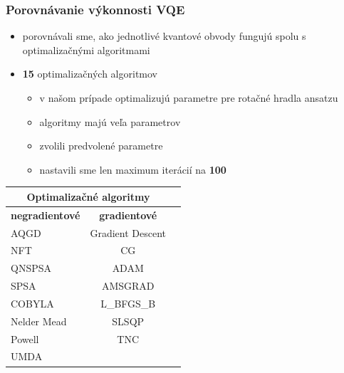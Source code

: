 \documentclass{beamer}
\begin{document}
\begin{frame}
    \frametitle{Porovnávanie výkonnosti VQE}
	\begin{itemize}
        \item porovnávali sme, ako jednotlivé kvantové obvody fungujú spolu s optimalizačnými algoritmami
        \item \textbf{15} optimalizačných algoritmov
        \begin{itemize}
            \item v našom prípade optimalizujú parametre pre rotačné hradla ansatzu
            \item algoritmy majú veľa parametrov
            \item zvolili predvolené parametre
            \item nastavili sme len maximum iterácií na \textbf{100}
        \end{itemize}
    \end{itemize}
          
        \begin{table}[H]
            \centering
            \begin{tabular}{|l|c|c|} 
                \hline
                \multicolumn{2}{|c|}{\textbf{Optimalizačné algoritmy}}\\
                \hline
                \multicolumn{1}{|c|}{\textbf{negradientové}} & \textbf{gradientové}\\
                \hline
                AQGD & Gradient Descent \\ 
                \hline
                NFT & CG \\ 
                \hline
                QNSPSA & ADAM \\ 
                \hline
                SPSA & AMSGRAD \\ 
                \hline
                COBYLA & L\_BFGS\_B \\ 
                \hline
                Nelder Mead & SLSQP \\ 
                \hline
                Powell & TNC \\ 
                \hline
                UMDA &  \\
                \hline
            \end{tabular}
        \end{table}

\end{frame}
\end{document}

